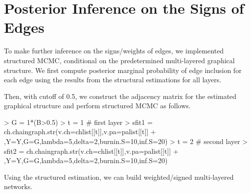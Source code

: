 \documentclass{article}
\begin{document}
\section{Posterior Inference on the Signs of Edges }
To make further inference on the signs/weights of edges, we implemented structured MCMC, conditional on the predetermined multi-layered graphical structure. We first compute posterior marginal probability of edge inclusion for each edge using the results from the structural estimations for all layers.
\begin{Schunk}
\end{Schunk}
Then, with cutoff of 0.5, we construct the adjacency matrix for the estimated graphical structure and perform structured MCMC as follows.
\begin{Schunk}
\begin{Sinput}
> G = 1*(B>0.5)
> t = 1 # first layer
> sfit1 = ch.chaingraph.str(v.ch=chlist[[t]],v.pa=palist[[t]]
+                           ,Y=Y,G=G,lambda=5,delta=2,burnin.S=10,inf.S=20)
> t = 2 # second layer
> sfit2 = ch.chaingraph.str(v.ch=chlist[[t]],v.pa=palist[[t]]
+                           ,Y=Y,G=G,lambda=5,delta=2,burnin.S=10,inf.S=20)
\end{Sinput}
\end{Schunk}
Using the structured estimation, we can build weighted/signed multi-layered networks.
\end{document}
